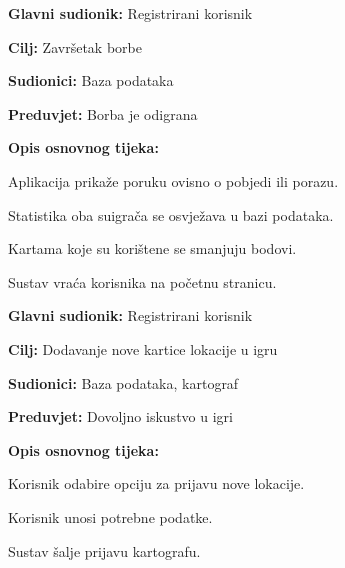 \noindent {}
\begin{packed_item}
	
	\item \textbf{Glavni sudionik: }Registrirani korisnik
	\item  \textbf{Cilj:} Završetak borbe
	\item  \textbf{Sudionici:} Baza podataka
	\item  \textbf{Preduvjet:} Borba je odigrana
	\item  \textbf{Opis osnovnog tijeka:}
	
	\item[] \begin{packed_enum}
		
		\item Aplikacija prikaže poruku ovisno o pobjedi ili porazu.
		\item Statistika oba suigrača se osvježava u bazi podataka.
		\item Kartama koje su korištene se smanjuju bodovi.
		\item Sustav vraća korisnika na početnu stranicu.
	\end{packed_enum}
\end{packed_item}
	
	\noindent {}
	\begin{packed_item}
		
		\item \textbf{Glavni sudionik: }Registrirani korisnik
		\item  \textbf{Cilj:} Dodavanje nove kartice lokacije u igru
		\item  \textbf{Sudionici:} Baza podataka, kartograf
		\item  \textbf{Preduvjet:} Dovoljno iskustvo u igri
		\item  \textbf{Opis osnovnog tijeka:}
		
		\item[] \begin{packed_enum}
			
			\item Korisnik odabire opciju za prijavu nove lokacije.
			\item Korisnik unosi potrebne podatke.
			\item Sustav šalje prijavu kartografu.
		\end{packed_enum}
	\end{packed_item}
	
				
					
